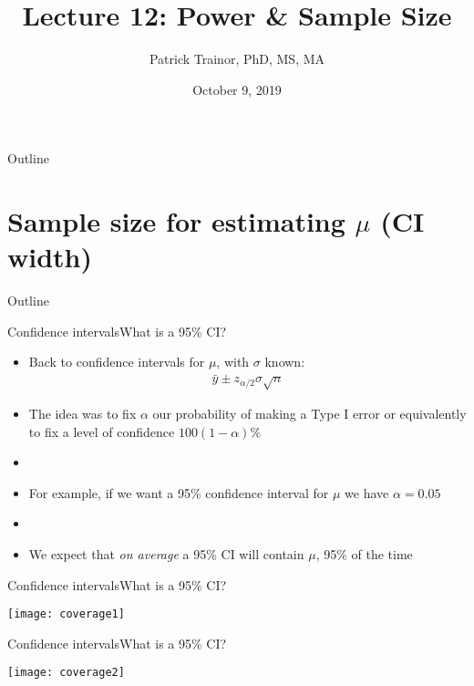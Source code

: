 \documentclass[xcolor=dvipsnames]{beamer}
\title[Lecture 12]{Lecture 12: Power \& Sample Size}
\author[Patrick Trainor]{Patrick Trainor, PhD, MS, MA}
\institute[NMSU]{New Mexico State University}
\date{October 9, 2019}
\begin{document}
\begin{frame}
\maketitle
\end{frame}

\begin{frame}{Outline}
\tableofcontents[hideallsubsections]
\end{frame}

\section{Sample size for estimating $\mu$ (CI width)}

\begin{frame}{Outline}
\tableofcontents[currentsection,subsectionstyle=show/shaded/hide]
\end{frame}

\begin{frame}{Confidence intervals}{What is a 95\% CI?}
\begin{itemize}
	\item Back to confidence intervals for $\mu$, with $\sigma$ known:
	\begin{gather*}
		\bar{y}\pm z_{\alpha/2} \sigma \sqrt{n}
	\end{gather*}  \pause
	\item The idea was to fix $\alpha$ our probability of making a Type I error or equivalently to fix a level of confidence $100(1-\alpha)\%$ \pause
	\item[]
	\item For example, if we want a 95\% confidence interval for $\mu$ we have $\alpha = 0.05$  \pause
	\item[]
	\item We expect that \emph{on average} a 95\% CI will contain $\mu$,  95\% of the time
\end{itemize}
\end{frame}

\begin{frame}{Confidence intervals}{What is a 95\% CI?}
	\begin{center}
		\texttt{[image: coverage1]}
	\end{center}
\end{frame}

\begin{frame}{Confidence intervals}{What is a 95\% CI?}
\begin{center}
	\texttt{[image: coverage2]}
\end{center}
\end{frame}
\end{document}
